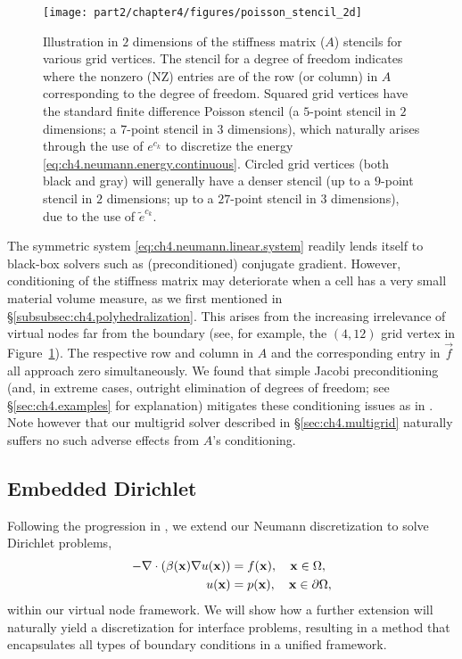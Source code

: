 \setlength{\figureheight}{0.50\columnwidth}
\begin{figure}[htbp]
\begin{center}
\texttt{[image: part2/chapter4/figures/poisson\_stencil\_2d]}
\caption{Illustration in $2$ dimensions of the stiffness matrix ($A$) stencils for various grid vertices. The stencil for a degree of freedom indicates where the nonzero (NZ) entries are of the row (or column) in $A$ corresponding to the degree of freedom. Squared grid vertices have the standard finite difference Poisson stencil (a $5$-point stencil in $2$ dimensions; a $7$-point stencil in $3$ dimensions), which naturally arises through the use of $e^{c_k}$ to discretize the energy \eqref{eq:ch4.neumann.energy.continuous}. Circled grid vertices (both black and gray) will generally have a denser stencil (up to a $9$-point stencil in $2$ dimensions; up to a $27$-point stencil in $3$ dimensions), due to the use of $\tilde{e}^{c_k}$.}
\label{fig:ch4.poisson.stencil}
\end{center}
\end{figure}

The symmetric system \eqref{eq:ch4.neumann.linear.system} readily lends itself to black-box solvers such as (preconditioned) conjugate gradient. However, conditioning of the stiffness matrix may deteriorate when a cell has a very small material volume measure, as we first mentioned in \S\ref{subsubsec:ch4.polyhedralization}. This arises from the increasing irrelevance of virtual nodes far from the boundary (see, for example, the $(4,12)$ grid vertex in Figure~\ref{fig:ch4.poisson.stencil}). The respective row and column in $A$ and the corresponding entry in $\vec{f}$ all approach zero simultaneously. We found that simple Jacobi preconditioning (and, in extreme cases, outright elimination of degrees of freedom; see \S\ref{sec:ch4.examples} for explanation) mitigates these conditioning issues as in \cite{Bedrossian10}. Note however that our multigrid solver described in \S\ref{sec:ch4.multigrid} naturally suffers no such adverse effects from $A$'s conditioning.

\subsection{Embedded Dirichlet} \label{subsec:ch4.discretization.dirichlet}

Following the progression in \cite{Bedrossian10}, we extend our Neumann discretization to solve Dirichlet problems,
\begin{equation} \label{eq:ch4.dirichlet}
\begin{split}
-\nabla \cdot \left( \beta(\mathbf{x}) \nabla u(\mathbf{x}) \right) & = f(\mathbf{x}), \quad  \mathbf{x} \in \Omega, \\
u(\mathbf{x}) & = p(\mathbf{x}), \quad \mathbf{x} \in \partial\Omega,
\end{split}
\end{equation}
within our virtual node framework. We will show how a further extension will naturally yield a discretization for interface problems, resulting in a method that encapsulates all types of boundary conditions in a unified framework.

